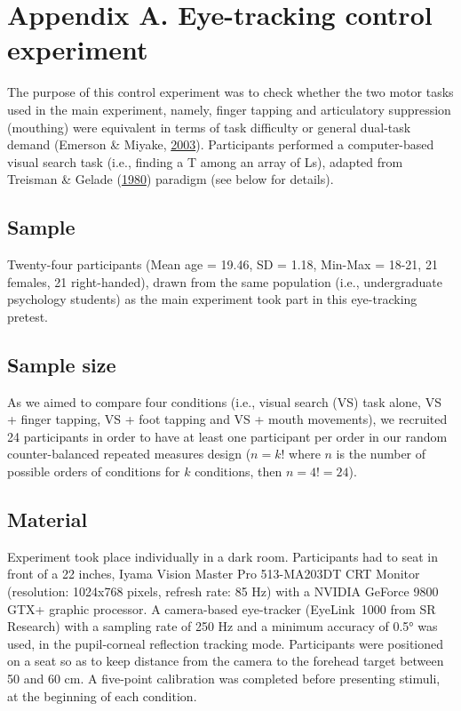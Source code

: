\documentclass[a4paper,12pt,twoside,openright,oldfontcommands]{memoir}
\begin{document}
\hypertarget{appendix-a.-eye-tracking-control-experiment}{%
\section{Appendix A. Eye-tracking control experiment}\label{appendix-a.-eye-tracking-control-experiment}}

The purpose of this control experiment was to check whether the two motor tasks used in the main experiment, namely, finger tapping and articulatory suppression (mouthing) were equivalent in terms of task difficulty or general dual-task demand (Emerson \& Miyake, \protect\hyperlink{ref-emerson_role_2003}{2003}). Participants performed a computer-based visual search task (i.e., finding a T among an array of Ls), adapted from Treisman \& Gelade (\protect\hyperlink{ref-treisman_feature-integration_1980}{1980}) paradigm (see below for details).

\hypertarget{sample-1}{%
\subsection{Sample}\label{sample-1}}

Twenty-four participants (Mean age = 19.46, SD = 1.18, Min-Max = 18-21, 21 females, 21 right-handed), drawn from the same population (i.e., undergraduate psychology students) as the main experiment took part in this eye-tracking pretest.

\hypertarget{sample-size}{%
\subsection{Sample size}\label{sample-size}}

As we aimed to compare four conditions (i.e., visual search (VS) task alone, VS + finger tapping, VS + foot tapping and VS + mouth movements), we recruited 24 participants in order to have at least one participant per order in our random counter-balanced repeated measures design (\(n = k!\) where \(n\) is the number of possible orders of conditions for \(k\) conditions, then \(n =4 != 24\)).

\hypertarget{material-4}{%
\subsection{Material}\label{material-4}}

Experiment took place individually in a dark room. Participants had to seat in front of a 22 inches, Iyama Vision Master Pro 513-MA203DT CRT Monitor (resolution: 1024x768 pixels, refresh rate: 85 Hz) with a NVIDIA GeForce 9800 GTX+ graphic processor. A camera-based eye-tracker (EyeLink\textregistered~1000 from SR Research) with a sampling rate of 250 Hz and a minimum accuracy of 0.5° was used, in the pupil-corneal reflection tracking mode. Participants were positioned on a seat so as to keep distance from the camera to the forehead target between 50 and 60 cm. A five-point calibration was completed before presenting stimuli, at the beginning of each condition.
\end{document}
